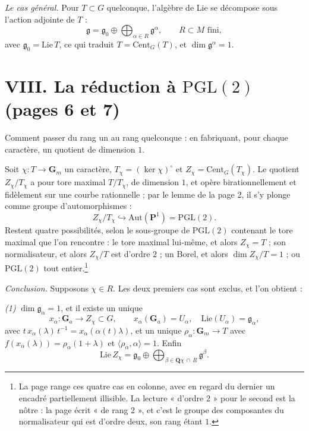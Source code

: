 \documentclass[11pt,a4paper]{article}
\begin{document}
\emph{Le cas général.} Pour $T \subset G$ quelconque, l'algèbre de Lie se
décompose sous l'action adjointe de $T$ :
\[
  \mathfrak{g} = \mathfrak{g}_0 \oplus \bigoplus_{\alpha \in R}
    \mathfrak{g}^\alpha, \qquad R \subset M \text{ fini},
\]
avec $\mathfrak{g}_0 = \mathrm{Lie}\,T$, ce qui traduit $T =
\mathrm{Cent}_G(T)$, et $\dim \mathfrak{g}^\alpha = 1$.

\section*{VIII. La réduction à $\mathrm{PGL}(2)$ (pages 6 et 7)}

Comment passer du rang un au rang quelconque : en fabriquant, pour chaque
caractère, un quotient de dimension $1$.

Soit $\chi : T \to \mathbf{G}_m$ un caractère, $T_\chi = (\ker \chi)^\circ$ et
$Z_\chi = \mathrm{Cent}_G(T_\chi)$. Le quotient $Z_\chi/T_\chi$ a pour tore
maximal $T/T_\chi$, de dimension $1$, et opère birationnellement et fidèlement
sur une courbe rationnelle ; par le lemme de la page 2, il s'y plonge comme
groupe d'automorphismes :
\[
  Z_\chi/T_\chi \hookrightarrow \mathrm{Aut}(\mathbf{P}^1) = \mathrm{PGL}(2).
\]
Restent quatre possibilités, selon le sous-groupe de $\mathrm{PGL}(2)$
contenant le tore maximal que l'on rencontre : le tore maximal lui-même, et
alors $Z_\chi = T$ ; son normalisateur, et alors $Z_\chi/T$ est d'ordre $2$ ;
un Borel, et alors $\dim Z_\chi/T = 1$ ; ou $\mathrm{PGL}(2)$ tout
entier.\footnote{La page range ces quatre cas en colonne, avec en regard du
dernier un encadré partiellement illisible. La lecture « d'ordre $2$ » pour le
second est la nôtre : la page écrit « de rang 2 », et c'est le groupe des
composantes du normalisateur qui est d'ordre deux, son rang étant $1$.}

\emph{Conclusion.} Supposons $\chi \in R$. Les deux premiers cas sont exclus,
et l'on obtient :

\emph{(1)} $\dim \mathfrak{g}_\alpha = 1$, et il existe un unique
\[
  x_\alpha : \mathbf{G}_a \longrightarrow Z_\chi \subset G, \qquad
  x_\alpha(\mathbf{G}_a) = U_\alpha, \quad
  \mathrm{Lie}(U_\alpha) = \mathfrak{g}_\alpha,
\]
avec $t\,x_\alpha(\lambda)\,t^{-1} = x_\alpha(\alpha(t)\lambda)$, et un unique
$\rho_\alpha : \mathbf{G}_m \to T$ avec $f(x_\alpha(\lambda)) =
\rho_\alpha(1+\lambda)$ et $\langle \rho_\alpha, \alpha \rangle = 1$. Enfin
\[
  \mathrm{Lie}\,Z_\chi = \mathfrak{g}_0 \oplus
    \bigoplus_{\beta \in \mathbf{Q}\chi \,\cap\, R} \mathfrak{g}^\beta .
\]
\end{document}

